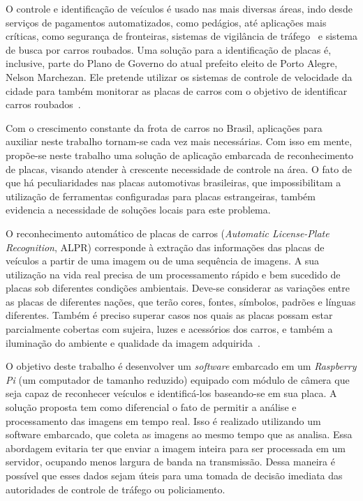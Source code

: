 O controle e identificação de veículos é usado nas mais diversas áreas, indo
desde serviços de pagamentos automatizados, como pedágios, até aplicações mais
críticas, como segurança de fronteiras, sistemas de vigilância de
tráfego~\cite{ahmad2015automatic} e sistema de busca por carros roubados.  Uma
solução para a identificação de placas é, inclusive,  parte do Plano de Governo
do atual prefeito eleito de Porto Alegre, Nelson Marchezan. Ele pretende
utilizar os sistemas de controle de velocidade da cidade para também monitorar
as placas de carros com o objetivo de identificar carros
roubados~\cite{psdb2016marchezan}.

Com o crescimento constante da frota de carros no Brasil, aplicações para
auxiliar neste trabalho tornam-se cada vez mais necessárias. Com isso em mente,
propõe-se neste trabalho uma solução de aplicação embarcada de reconhecimento de
placas, visando atender à crescente necessidade de controle na área. O fato de
que há peculiaridades nas placas automotivas brasileiras, que impossibilitam a
utilização de ferramentas configuradas para placas estrangeiras, também
evidencia a necessidade de soluções locais para este problema.

O reconhecimento automático de placas de carros (\emph{Automatic License-Plate
Recognition}, ALPR) corresponde à extração das informações das placas de
veículos a partir de uma imagem ou de uma sequência de imagens. A sua utilização
na vida real precisa de um processamento rápido e bem sucedido de placas sob
diferentes condições ambientais. Deve-se considerar as variações entre as placas
de diferentes nações, que terão cores, fontes, símbolos, padrões e línguas
diferentes. Também é preciso superar casos nos quais as placas possam estar
parcialmente cobertas com sujeira, luzes e acessórios dos carros, e também a
iluminação do ambiente e qualidade da imagem adquirida~\cite{s2013automatic}.

O objetivo deste trabalho é desenvolver um \emph{software} embarcado em um
\emph{Raspberry Pi} (um computador de tamanho reduzido) equipado com módulo de
câmera que seja capaz de reconhecer veículos e identificá-los baseando-se em sua
placa. A solução proposta tem como diferencial o fato de permitir a análise e
processamento das imagens em tempo real. Isso é realizado utilizando um software
embarcado, que coleta as imagens ao mesmo tempo que as analisa. Essa abordagem
evitaria ter que enviar a imagem inteira para ser processada em um servidor,
ocupando menos largura de banda na transmissão. Dessa maneira é possível que
esses dados sejam úteis para uma tomada de decisão imediata das autoridades de
controle de tráfego ou policiamento.

